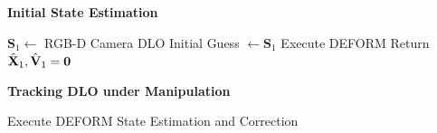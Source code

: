 \begin{algorithm}[t]
\caption{Tracking DLO with Modeling} 
\label{code:DLO tracking}
\textbf{Initial State Estimation}
\begin{algorithmic}[1]
\Require $\textbf{S}_1 \leftarrow $ RGB-D Camera
\State DLO Initial Guess $\leftarrow \textbf{S}_1$
\State Execute DEFORM 
\EndWhile
\State Return $\hat{\textbf{X}}_\text{1}, \hat{\textbf{V}}_1 = \textbf{0}$
\end{algorithmic}
\textbf{Tracking DLO under Manipulation}
\begin{algorithmic}[1]
\State Execute DEFORM 
\EndWhile
\State State Estimation and Correction
\EndWhile
\end{algorithmic}
\end{algorithm}





